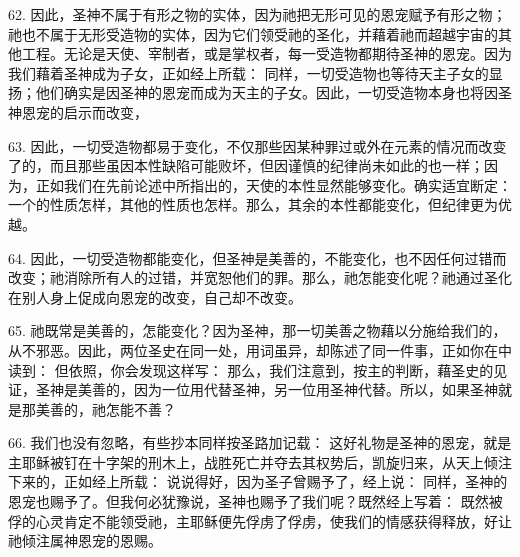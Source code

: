 62. 因此，圣神不属于有形之物的实体，因为祂把无形可见的恩宠赋予有形之物；祂也不属于无形受造物的实体，因为它们领受祂的圣化，并藉着祂而超越宇宙的其他工程。无论是天使、宰制者，或是掌权者，每一受造物都期待圣神的恩宠。因为我们藉着圣神成为子女，正如经上所载： 同样，一切受造物也等待天主子女的显扬；他们确实是因圣神的恩宠而成为天主的子女。因此，一切受造物本身也将因圣神恩宠的启示而改变，\par

63. 因此，一切受造物都易于变化，不仅那些因某种罪过或外在元素的情况而改变了的，而且那些虽因本性缺陷可能败坏，但因谨慎的纪律尚未如此的也一样；因为，正如我们在先前论述中所指出的，天使的本性显然能够变化。确实适宜断定：一个的性质怎样，其他的性质也怎样。那么，其余的本性都能变化，但纪律更为优越。\par

64. 因此，一切受造物都能变化，但圣神是美善的，不能变化，也不因任何过错而改变；祂消除所有人的过错，并宽恕他们的罪。那么，祂怎能变化呢？祂通过圣化在别人身上促成向恩宠的改变，自己却不改变。\par

65. 祂既常是美善的，怎能变化？因为圣神，那一切美善之物藉以分施给我们的，从不邪恶。因此，两位圣史在同一处，用词虽异，却陈述了同一件事，正如你在中读到： 但依照，你会发现这样写： 那么，我们注意到，按主的判断，藉圣史的见证，圣神是美善的，因为一位用代替圣神，另一位用圣神代替。所以，如果圣神就是那美善的，祂怎能不善？\par

66. 我们也没有忽略，有些抄本同样按圣路加记载： 这好礼物是圣神的恩宠，就是主耶稣被钉在十字架的刑木上，战胜死亡并夺去其权势后，凯旋归来，从天上倾注下来的，正如经上所载： 说说得好，因为圣子曾赐予了，经上说： 同样，圣神的恩宠也赐予了。但我何必犹豫说，圣神也赐予了我们呢？既然经上写着： 既然被俘的心灵肯定不能领受祂，主耶稣便先俘虏了俘虏，使我们的情感获得释放，好让祂倾注属神恩宠的恩赐。\par

